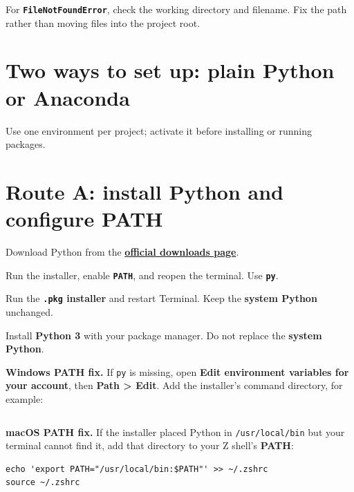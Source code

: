 \begin{pitfall}
For \textbf{\texttt{FileNotFoundError}}, check the working directory and filename. Fix the path rather than moving files into the project root.
\end{pitfall}

\section{Two ways to set up: plain Python or Anaconda}

\begin{keyidea}
Use one environment per project; activate it before installing or running packages.
\end{keyidea}

\section{Route A: install Python and configure PATH}

Download Python from the \href{https://www.python.org/downloads/}{\textbf{official downloads page}}.

\begin{description}[leftmargin=1.15in,style=nextline]
  \item[Windows] Run the installer, enable \textbf{\texttt{PATH}}, and reopen the terminal. Use \textbf{\texttt{py}}.
  \item[macOS] Run the \textbf{\texttt{.pkg} installer} and restart Terminal. Keep the \textbf{system Python} unchanged.
  \item[Linux] Install \textbf{Python 3} with your package manager. Do not replace the \textbf{system Python}.
\end{description}

\textbf{Windows PATH fix.} If \texttt{py} is missing, open \textbf{Edit environment variables for your account}, then \textbf{Path > Edit}. Add the installer's command directory, for example:

\begin{lstlisting}[style=mlterminal]
%LocalAppData%\Python\bin
\end{lstlisting}

\textbf{macOS PATH fix.} If the installer placed Python in \texttt{/usr/local/bin} but your terminal cannot find it, add that directory to your Z shell's \textbf{PATH}:

\begin{lstlisting}[style=mlterminal]
echo 'export PATH="/usr/local/bin:$PATH"' >> ~/.zshrc
source ~/.zshrc
\end{lstlisting}

